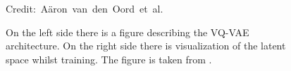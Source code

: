 \begin{figure}[H]
    \centering

    \caption{On the left side there is a figure describing the VQ-VAE architecture. On the right side there is visualization of the latent space whilst training. The figure is taken from \cite{vqvae}.}
  	\medskip 
	\hspace*{15pt}\hbox{\scriptsize Credit: Aäron van den Oord et al.}
    \label{VQVAEFigure}

\end{figure}
